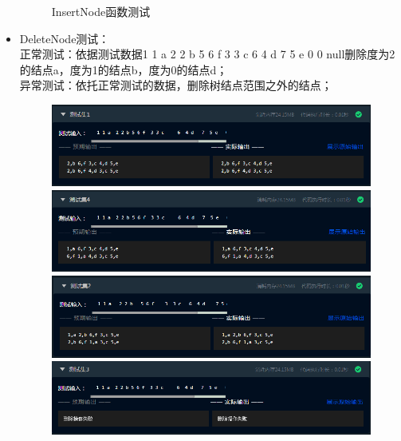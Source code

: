 \documentclass[supercite]{Experimental_Report}
\theoremstyle{definition}
\begin{document}
\begin{itemize}
\begin{figure}[htbp]
\begin{minipage}{0.9\linewidth}
		      \end{minipage}
		      \caption{InsertNode函数测试}
		      \label{fig2-11}
	      \end{figure}
	\item DeleteNode测试：\\正常测试：依据测试数据1 1 a  2 2 b 5 6 f  3 3 c 6  4 d   7  5 e   0  0 null删除度为2的结点a，度为1的结点b，度为0的结点d；\\
	      异常测试：依托正常测试的数据，删除树结点范围之外的结点；
	      \begin{figure}[htbp]
		      \centering
		      \begin{minipage}{0.9\linewidth}
			      \centering
			      \includegraphics[width=0.9\linewidth]{images/test-77.png}
		      \end{minipage}
		      \begin{minipage}{0.9\linewidth}
			      \centering
			      \includegraphics[width=0.9\linewidth]{images/test-80.png}
		      \end{minipage}
		      \begin{minipage}{0.9\linewidth}
			      \centering
			      \includegraphics[width=0.9\linewidth]{images/test-78.png}
		      \end{minipage}
		      \begin{minipage}{0.9\linewidth}
			      \centering
			      \includegraphics[width=0.9\linewidth]{images/test-79.png}

\end{minipage}
\end{figure}
\end{itemize}
\end{document}
